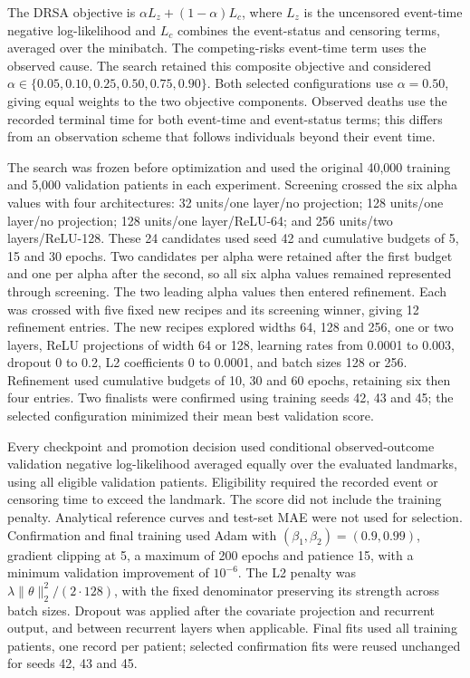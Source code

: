 The DRSA objective is $\alpha L_z+(1-\alpha)L_c$, where $L_z$ is the uncensored event-time negative log-likelihood and $L_c$ combines the event-status and censoring terms, averaged over the minibatch. The competing-risks event-time term uses the observed cause. The search retained this composite objective and considered $\alpha\in\{0.05,0.10,0.25,0.50,0.75,0.90\}$. Both selected configurations use $\alpha=0.50$, giving equal weights to the two objective components. Observed deaths use the recorded terminal time for both event-time and event-status terms; this differs from an observation scheme that follows individuals beyond their event time.

The search was frozen before optimization and used the original 40,000 training and 5,000 validation patients in each experiment. Screening crossed the six alpha values with four architectures: 32 units/one layer/no projection; 128 units/one layer/no projection; 128 units/one layer/ReLU-64; and 256 units/two layers/ReLU-128. These 24 candidates used seed 42 and cumulative budgets of 5, 15 and 30 epochs. Two candidates per alpha were retained after the first budget and one per alpha after the second, so all six alpha values remained represented through screening. The two leading alpha values then entered refinement. Each was crossed with five fixed new recipes and its screening winner, giving 12 refinement entries. The new recipes explored widths 64, 128 and 256, one or two layers, ReLU projections of width 64 or 128, learning rates from 0.0001 to 0.003, dropout 0 to 0.2, L2 coefficients 0 to 0.0001, and batch sizes 128 or 256. Refinement used cumulative budgets of 10, 30 and 60 epochs, retaining six then four entries. Two finalists were confirmed using training seeds 42, 43 and 45; the selected configuration minimized their mean best validation score.

Every checkpoint and promotion decision used conditional observed-outcome validation negative log-likelihood averaged equally over the evaluated landmarks, using all eligible validation patients. Eligibility required the recorded event or censoring time to exceed the landmark. The score did not include the training penalty. Analytical reference curves and test-set MAE were not used for selection. Confirmation and final training used Adam with $(\beta_1,\beta_2)=(0.9,0.99)$, gradient clipping at 5, a maximum of 200 epochs and patience 15, with a minimum validation improvement of $10^{-6}$. The L2 penalty was $\lambda\|\theta\|_2^2/(2\cdot128)$, with the fixed denominator preserving its strength across batch sizes. Dropout was applied after the covariate projection and recurrent output, and between recurrent layers when applicable. Final fits used all training patients, one record per patient; selected confirmation fits were reused unchanged for seeds 42, 43 and 45.

